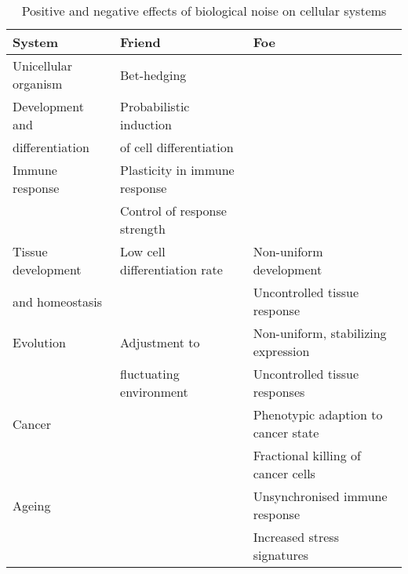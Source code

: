 \begin{table}[hb	]
\centering
\caption{Positive and negative effects of biological noise on cellular systems}
\label{table:effects_noise}
\begin{tabular}{l l l}
\toprule
\toprule
\textbf{System} & \textbf{Friend} & \textbf{Foe} \\ 
\midrule
\midrule
Unicellular organism & Bet-hedging & \\
\midrule
Development and & Probabilistic induction  & \\
differentiation & of cell differentiation & \\
\midrule
Immune response & Plasticity in immune response & \\
 & Control of response strength &   \\
\midrule
Tissue development  & Low cell differentiation rate & Non-uniform development \\ 
and homeostasis &  & Uncontrolled tissue response \\
\midrule
Evolution & Adjustment to  & Non-uniform, stabilizing expression \\ 
& fluctuating environment & Uncontrolled tissue responses \\
\midrule
Cancer &  & Phenotypic adaption to cancer state \\
& & Fractional killing of cancer cells \\
\midrule
Ageing &  & Unsynchronised immune response \\
& & Increased stress signatures \\ 
\bottomrule
\bottomrule
\end{tabular}
\end{table}
